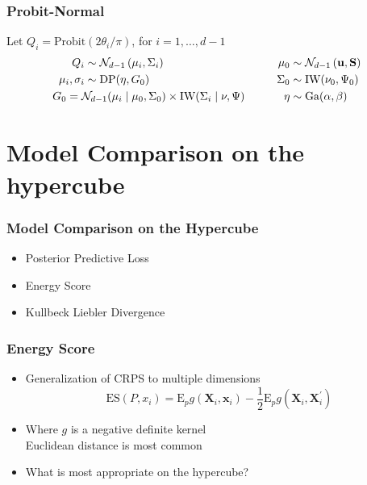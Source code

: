 \documentclass[aspectratio=169]{beamer}
\begin{document}
\begin{frame}
  \frametitle{Probit-Normal}
  Let $Q_i = \text{Probit}(2\theta_i / \pi)$, for $i = 1,\ldots,d-1$
  \begin{equation*}
    \begin{aligned}
                Q_i &\sim \mathcal{N}_{d-1}\left(\mu_i, \Sigma_i\right)\\
    \mu_i, \sigma_i &\sim \text{DP}(\eta, G_0)\\
                    &\hspace{-1cm}G_0 =
                      \mathcal{N}_{d-1}(\mu_i\mid\mu_0,\Sigma_0)\times \text{IW}(\Sigma_i\mid\nu,\Psi)
    \end{aligned}
    \hspace{1cm}
    \begin{aligned}
              \mu_0 &\sim \mathcal{N}_{d-1}\left({\bf u},{\bf S}\right)\\
           \Sigma_0 &\sim \text{IW}(\nu_0,\Psi_0)\\
               \eta &\sim \text{Ga}(\alpha, \beta)
    \end{aligned}
  \end{equation*}
\end{frame}

\section{Model Comparison on the hypercube}

\begin{frame}
  \frametitle{Model Comparison on the Hypercube}
  \begin{itemize}
    \item Posterior Predictive Loss
    \item Energy Score
    \item Kullbeck Liebler Divergence
  \end{itemize}
\end{frame}

\begin{frame}
  \frametitle{Energy Score}
  \begin{itemize}
    \item Generalization of CRPS to multiple dimensions
    \begin{equation*}
      \label{eq:es}
      \text{ES}\left(P,x_i\right) =  \text{E}_p g\left(\bm{X}_i, \bm{x}_i\right)
                - \frac{1}{2}\text{E}_p g\left(\bm{X}_i,\bm{X}_i^{\prime}\right)
    \end{equation*}
    \pause
    \item Where $g$ is a negative definite kernel\\
      Euclidean distance is most common
    \pause
    \item What is most appropriate on the hypercube?
  \end{itemize}
\end{frame}
\end{document}
